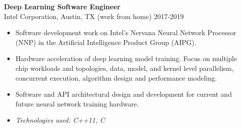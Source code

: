 \textbf{Deep Learning Software Engineer}\\
 Intel Corporation, Austin, TX (work from home) \hfill 2017-2019

\begin{itemize} \itemsep -2pt

\item Software development work on Intel's Nervana Neural Network
      Processor (NNP) in the Artificial Intelligence Product Group
      (AIPG).

\item Hardware acceleration of deep learning model training.
      Focus on multiple chip workloads and topologies, data,
      model, and kernel level parallelism, concurrent
      execution, algorithm design and performance modeling.

\item Software and API architectural design and development for
      current and future neural network training hardware.

\item \textit{Technologies used: C++11, C}

\end{itemize}
